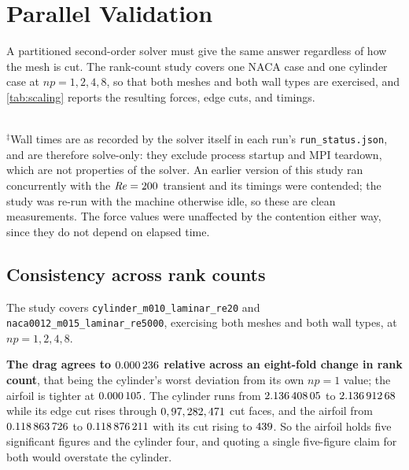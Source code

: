 \section{Parallel Validation}
\label{sec:parallel}

A partitioned second-order solver must give the same answer regardless of how the
mesh is cut. The rank-count study covers one NACA case and one cylinder case at
$np=1,2,4,8$, so that both meshes and both wall types are exercised, and
\cref{tab:scaling} reports the resulting forces, edge cuts, and timings.

\begin{table}[htbp]
  \centering
  \caption{Rank-count study on one cylinder and one airfoil case. Every run uses
  an identical fixed budget of 1500 pseudo-time steps, so the comparison is
  like-for-like, with $C_D$ from \texttt{forces.csv} and the edge cut from
  \texttt{metadata.json}. The deviation column is relative to that case's own
  $np=1$ result.}
  \label{tab:scaling}
  \small
  
  \\[2pt]
  \footnotesize $^\ddagger$Wall times are as recorded by the solver itself in each run's
  \texttt{run\_status.json}, and are therefore solve-only: they exclude process startup and
  MPI teardown, which are not properties of the solver. An earlier version of this study ran
  concurrently with the
  $\mathit{Re}=200$ transient and its timings were contended; the study was re-run with the
  machine otherwise idle, so these are clean measurements. The force values were unaffected
  by the contention either way, since they do not depend on elapsed time.
\end{table}

\subsection{Consistency across rank counts}
\label{sec:rankconsistency}

The study covers \texttt{cylinder\_m010\_laminar\_re20} and
\texttt{naca0012\_m015\_laminar\_re5000}, exercising both meshes and both wall
types, at $np=1,2,4,8$.

\textbf{The drag agrees to $\num{0.000236}$ relative across an eight-fold change
in rank count}, that being the cylinder's worst deviation from its own $np=1$ value; the
airfoil is tighter at $\num{0.000105}$. The cylinder runs from
$\num{2.13640805}$ to $\num{2.13691268}$ while its edge cut rises through $0, 97,
282, \num{471}$ cut faces, and the airfoil from $\num{0.118863726}$ to
$\num{0.118876211}$ with its cut rising to $\num{439}$. So the airfoil
holds five significant figures and the cylinder four, and quoting a single five-figure
claim for both would overstate the cylinder.

